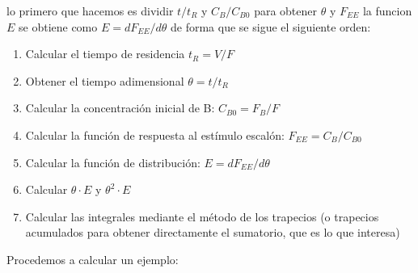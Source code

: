 \noindent lo primero que hacemos es dividir \textbf{$t/t_R$} y \textbf{$C_B/C_{B0}$} para obtener $\theta$ y $F_{EE}$ la funcion $E$ se obtiene como $E=dF_{EE}/d\theta$ de forma que se sigue el siguiente orden:
\begin{enumerate}
    \item Calcular el tiempo de residencia $t_R = V/F$

    \item Obtener el tiempo adimensional $\theta = t/t_R$

    \item Calcular la concentración inicial de B:
          $C_{B0} = F_{B}/F$

    \item Calcular la función de respuesta al estímulo escalón:
          \textbf{$F_{EE} = C_{B}/C_{B0}$}

    \item Calcular la función de distribución:
          \textbf{$E = dF_{EE}/d\theta$}

    \item Calcular $\theta \cdot E$ y $\theta^2 \cdot E$

    \item Calcular las integrales mediante el método de los trapecios
          (o trapecios acumulados para obtener directamente el sumatorio, que es lo que interesa)
\end{enumerate}
\noindent Procedemos a calcular un ejemplo:
